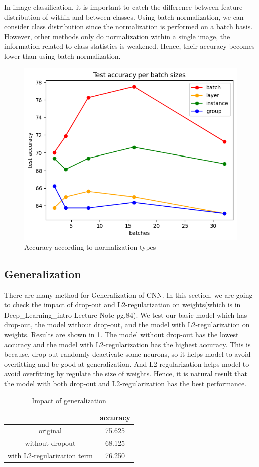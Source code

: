 In image classification, it is important to catch the difference between feature distribution of within and between classes. Using batch normalization, we can consider class distribution since the normalization is performed on a batch basis. However, other methods only do normalization within a single image, the information related to class statistics is weakened. Hence, their accuracy becomes lower than using batch normalization.

\begin{figure}[htbp]
	\centering
	\includegraphics[width=0.5\linewidth]{image/q4-3.png}
	\caption{Accuracy according to normalization types}
	\label{fig:normalization}
\end{figure}

\subsection{Generalization}
There are many method for Generalization of CNN. In this section, we are going to check the impact of drop-out and L2-regularization on weights(which is in Deep\_Learning\_intro Lecture Note pg.84). We test our basic model which has drop-out, the model without drop-out, and the model with L2-regularization on weights. Results are shown in \cref{table:generalization}. The model without drop-out has the lowest accuracy and the model with L2-regularization has the highest accuracy. This is because, drop-out randomly deactivate some neurons, so it helps model to avoid overfitting and be good at generalization. And L2-regularization helps model to avoid overfitting by regulate the size of weights.
Hence, it is natural result that the model with both drop-out and L2-regularization has the best performance.

\begin{table}[htbp]
	\centering
	\setlength{\tabcolsep}{6pt}
	\renewcommand{\arraystretch}{1.5}
	\begin{tabular}{|c||c|}
	\hline
	& accuracy  \\ \hline\hline
	original & 75.625  \\ \hline
	without dropout & 68.125  \\ \hline
	with L2-regularization term & 76.250  \\ \hline
	\end{tabular}
        \caption{Impact of generalization}
	\label{table:generalization}
\end{table}
	

